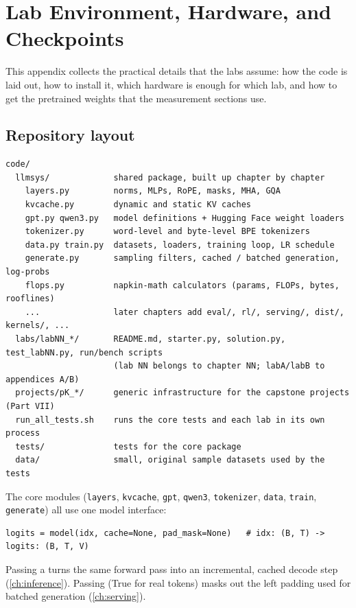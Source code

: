 \chapter{Lab Environment, Hardware, and Checkpoints}\label{app:setup}

This appendix collects the practical details that the labs assume: how the code is laid out,
how to install it, which hardware is enough for which lab, and how to get the pretrained weights
that the measurement sections use.

\section{Repository layout}

\begin{lstlisting}[style=plain]
code/
  llmsys/             shared package, built up chapter by chapter
    layers.py         norms, MLPs, RoPE, masks, MHA, GQA
    kvcache.py        dynamic and static KV caches
    gpt.py qwen3.py   model definitions + Hugging Face weight loaders
    tokenizer.py      word-level and byte-level BPE tokenizers
    data.py train.py  datasets, loaders, training loop, LR schedule
    generate.py       sampling filters, cached / batched generation, log-probs
    flops.py          napkin-math calculators (params, FLOPs, bytes, rooflines)
    ...               later chapters add eval/, rl/, serving/, dist/, kernels/, ...
  labs/labNN_*/       README.md, starter.py, solution.py, test_labNN.py, run/bench scripts
                      (lab NN belongs to chapter NN; labA/labB to appendices A/B)
  projects/pK_*/      generic infrastructure for the capstone projects (Part VII)
  run_all_tests.sh    runs the core tests and each lab in its own process
  tests/              tests for the core package
  data/               small, original sample datasets used by the tests
\end{lstlisting}

The core modules (\texttt{layers}, \texttt{kvcache}, \texttt{gpt}, \texttt{qwen3},
\texttt{tokenizer}, \texttt{data}, \texttt{train}, \texttt{generate}) all use one model
interface:
\begin{lstlisting}
logits = model(idx, cache=None, pad_mask=None)   # idx: (B, T) -> logits: (B, T, V)
\end{lstlisting}
Passing a  turns the same forward pass into an incremental, cached decode step
(\cref{ch:inference}). Passing  (True for real tokens) masks out the
left padding used for batched generation (\cref{ch:serving}).


